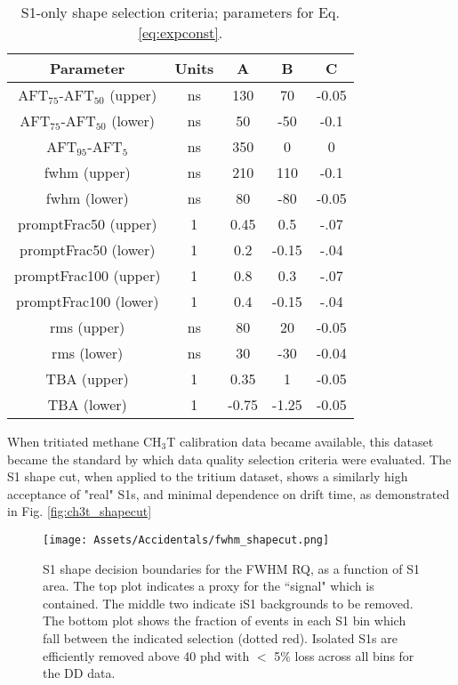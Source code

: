 \begin{table}
    \centering
    \begin{tabular}{|c|c|c|c|c|}
    \hline
        Parameter &Units& A & B &C  \\
        \hline
        AFT$_{75}$-AFT$_{50}$ (upper) & ns & 130 & 70 & -0.05\\
        AFT$_{75}$-AFT$_{50}$ (lower)& ns &  50 & -50 & -0.1\\
        AFT$_{95}$-AFT$_5$ &ns & 350 & 0 & 0\\
        fwhm (upper) &ns& 210 & 110 & -0.1\\
        fwhm (lower) & ns& 80 & -80 & -0.05\\
        promptFrac50 (upper) & 1 & 0.45& 0.5 & -.07\\
        promptFrac50 (lower) & 1 &  0.2& -0.15& -.04\\
        promptFrac100 (upper) & 1 & 0.8& 0.3 & -.07\\
        promptFrac100 (lower) & 1 &  0.4& -0.15& -.04\\
        rms (upper) & ns & 80& 20& -0.05\\
        rms (lower) & ns& 30 & -30 & -0.04\\
        TBA (upper) & 1 & 0.35 & 1 &  -0.05\\
        TBA (lower) & 1 &  -0.75 & -1.25 &  -0.05\\
        
        \hline
    \end{tabular}
    \caption{S1-only shape selection criteria; parameters for Eq. \ref{eq:expconst}.}
    \label{tab:s1onlyshape}
\end{table}

When tritiated methane CH$_3$T calibration data became available, this dataset became the standard by which data quality selection criteria were evaluated.
The S1 shape cut, when applied to the tritium dataset, shows a similarly high acceptance of "real" S1s, and minimal dependence on drift time, as demonstrated in Fig. \ref{fig:ch3t_shapecut}

\begin{figure}
    \centering
    \texttt{[image: Assets/Accidentals/fwhm\_shapecut.png]}
    \caption[S1 shape decision boundaries for the FWHM RQ, as a function of S1 area.]%
    {S1 shape decision boundaries for the FWHM RQ, as a function of S1 area.
    The top plot indicates a proxy for the ``signal" which is contained.
    The middle two indicate iS1 backgrounds to be removed.
    The bottom plot shows the fraction of events in each S1 bin which fall between the indicated selection (dotted red).
    Isolated S1s are efficiently removed above 40 phd with $<$ 5\% loss across all bins for the DD data.}
    \label{fig:fwhm_shapecut}
\end{figure}

